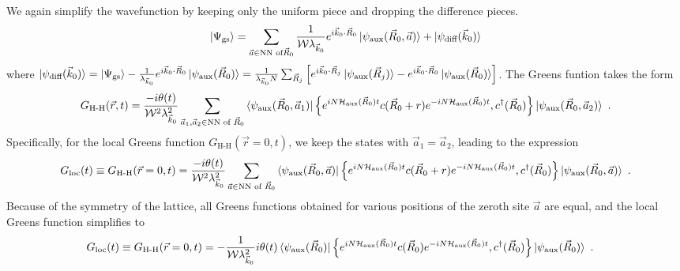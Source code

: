 \documentclass{report}
\numberwithin{equation}{section}
\begin{document}
We again simplify the wavefunction by keeping only the uniform piece and dropping the difference pieces.
\begin{equation}\begin{aligned}
	\ket{\Psi_\text{gs}} = \sum_{\vec a \in \text{NN of}\vec R_0}\frac{1}{\mathcal{W}\lambda_{\vec k_0}} e^{i\vec{k}_0\cdot\vec{R}_0} \ket{\psi_\text{aux}(\vec R_0, \vec a)} + \ket{\psi_\text{diff}(\vec k_0)}
\end{aligned}\end{equation}
where \(\ket{\psi_\text{diff}(\vec k_0)} = \ket{\Psi_\text{gs}} - \frac{1}{\lambda_{\vec k_0}} e^{i\vec{k}_0\cdot\vec{R}_0} \ket{\psi_\text{aux}(\vec R_0)} = \frac{1}{\lambda_{\vec k_0} N}\sum_{\vec R_j} \left[e^{i \vec{k}_0\cdot\vec{R}_j} \ket{\psi_\text{aux}(\vec R_j)} - e^{i\vec{k}_0\cdot\vec{R}_0} \ket{\psi_\text{aux}(\vec R_0)}\right]\). The Greens funtion takes the form
\begin{equation}\begin{aligned}
G_\text{H-H}(\vec r, t) =  \frac{-i\theta(t)}{\mathcal{W}^2 \lambda_{\vec k_0}^2}\sum_{\vec a_1, \vec a_2 \in \text{NN of }\vec R_0}\braket{\psi_\text{aux}(\vec R_0, \vec a_1) | \left\{ e^{i N \mathcal{H}_\text{aux}(\vec R_0) t}c(\vec R_0 + r)e^{-i N \mathcal{H}_\text{aux}(\vec R_0) t}, c^\dagger(\vec R_0) \right\} | \psi_\text{aux}(\vec R_0, \vec a_2)}~.
\end{aligned}\end{equation}
Specifically, for the local Greens function \(G_\text{H-H}(\vec r=0, t)\), we keep the states with \(\vec a_1 = \vec a_2\), leading to the expression
\begin{equation}\begin{aligned}\label{greens_func_approx}
	G_\text{loc}(t) \equiv G_\text{H-H}(\vec r=0, t) =  \frac{-i\theta(t)}{\mathcal{W}^2 \lambda_{\vec k_0}^2}\sum_{\vec a \in \text{NN of }\vec R_0}\braket{\psi_\text{aux}(\vec R_0, \vec a) | \left\{ e^{i N \mathcal{H}_\text{aux}(\vec R_0) t}c(\vec R_0 + r)e^{-i N \mathcal{H}_\text{aux}(\vec R_0) t}, c^\dagger(\vec R_0) \right\} | \psi_\text{aux}(\vec R_0, \vec a)}~.
\end{aligned}\end{equation}
Because of the symmetry of the lattice, all Greens functions obtained for various positions of the zeroth site \(\vec a\) are equal, and the local Greens function simplifies to
\begin{equation}\begin{aligned}
	G_\text{loc}(t) \equiv G_\text{H-H}(\vec r=0, t) &= -\frac{1}{\mathcal{W}\lambda_{\vec k_0}^2 }i\theta(t) \braket{\psi_\text{aux}(\vec R_0) | \left\{ e^{i N \mathcal{H}_\text{aux}(\vec R_0) t}c(\vec R_0)e^{-i N \mathcal{H}_\text{aux}(\vec R_0) t}, c^\dagger(\vec R_0) \right\} | \psi_\text{aux}(\vec R_0)}~.
\end{aligned}\end{equation}
\end{document}
